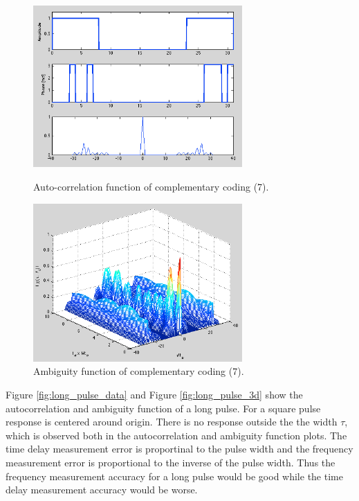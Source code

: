 \documentclass{article}
\begin{document}
\begin{figure}[htb]
\begin{minipage}[t]{0.5\linewidth}
\centering
\includegraphics[width=8cm]{Figures/complementary_data.png}
\caption{Auto-correlation function of complementary coding (7).}
\label{fig:complementary_data}
\end{minipage}
\begin{minipage}[t]{0.5\linewidth}
\centering
\includegraphics[width=8cm]{Figures/complementary_3d.png}
\caption{Ambiguity function of complementary coding (7).}
\label{fig:complementary_3d}
\end{minipage}
\end{figure}

Figure \ref{fig:long_pulse_data} and Figure \ref{fig:long_pulse_3d} show the autocorrelation and ambiguity function of a long pulse. For a square pulse response is centered around origin. There is no response outside the the width $\tau$, which is observed both in the autocorrelation and ambiguity function plots. The time delay measurement error is proportinal to the pulse width and the frequency measurement error is proportional to the inverse of the pulse width. Thus the frequency measurement accuracy for a long pulse would be good while the time delay measurement accuracy would be worse. \cite{Skolnik:2001irs}
\end{document}
